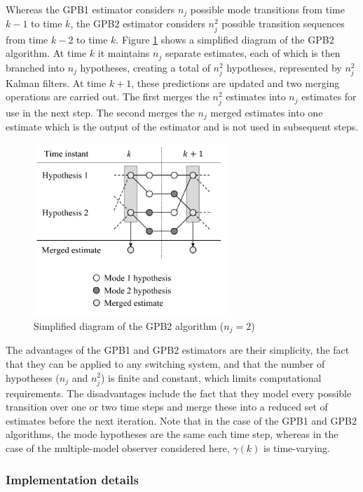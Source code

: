 Whereas the GPB1 estimator considers $n_j$ possible mode transitions from time $k-1$ to time $k$, the GPB2 estimator considers $n_j^2$ possible transition sequences from time $k-2$ to time $k$. Figure \ref{fig:mm-obs-gpb2} shows a simplified diagram of the GPB2 algorithm. At time $k$ it maintains $n_j$ separate estimates, each of which is then branched into $n_j$ hypotheses, creating a total of $n_j^2$ hypotheses, represented by $n_j^2$ Kalman filters. At time $k+1$, these predictions are updated and two merging operations are carried out. The first merges the $n_j^2$ estimates into $n_j$ estimates for use in the next step. The second merges the $n_j$ merged estimates into one estimate which is the output of the estimator and is not used in subsequent steps.
\begin{figure}[htp]
	\centering
	\includegraphics[height=6.5cm]{images/gpb2_diagram.pdf}
	\caption{Simplified diagram of the GPB2 algorithm ($n_j=2$)}
	\label{fig:mm-obs-gpb2}
\end{figure}

The advantages of the GPB1 and GPB2 estimators are their simplicity, the fact that they can be applied to any switching system, and that the number of hypotheses ($n_j$ and $n_j^2$) is finite and constant, which limits computational requirements. The disadvantages include the fact that they model every possible transition over one or two time steps and merge these into a reduced set of estimates before the next iteration. Note that in the case of the GPB1 and GPB2 algorithms, the mode hypotheses are the same each time step, whereas in the case of the multiple-model observer considered here, $\gamma(k)$ is time-varying.

\subsubsection{Implementation details} \label{subsec-implementation}

